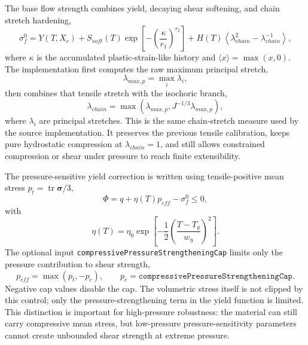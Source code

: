 The base flow strength combines yield, decaying shear softening, and chain stretch hardening,
\begin{equation}
  \sigma_f^0 =
  Y(T,X_c)
  + S_{soft}(T)\exp\left[-\left(\frac{\kappa}{r_1}\right)^{r_2}\right]
  + H(T)\left\langle \lambda_{chain}^{2}-\lambda_{chain}^{-1}\right\rangle,
  \label{eq:surface-polymer-base-flow}
\end{equation}
where \(\kappa\) is the accumulated plastic-strain-like history and \(\langle x\rangle=\max(x,0)\).  The implementation first computes the raw maximum principal stretch,
\begin{equation}
  \lambda_{max,p}=\max_i \lambda_i,
\end{equation}
then combines that tensile stretch with the isochoric branch,
\begin{equation}
  \lambda_{chain}=\max\left(\lambda_{max,p}, J^{-1/3}\lambda_{max,p}\right),
  \label{eq:surface-polymer-chain-stretch}
\end{equation}
where \(\lambda_i\) are principal stretches.  This is the same chain-stretch measure used by the source implementation.  It preserves the previous tensile calibration, keeps pure hydrostatic compression at \(\lambda_{chain}=1\), and still allows constrained compression or shear under pressure to reach finite extensibility.

The pressure-sensitive yield correction is written using tensile-positive mean stress \(p_t=\operatorname{tr}\boldsymbol{\sigma}/3\),
\begin{equation}
  \Phi=q+\eta(T)p_{eff}-\sigma_f^0\le 0,
  \label{eq:surface-polymer-yield}
\end{equation}
with
\begin{equation}
  \eta(T)=\eta_0\exp\left[-\frac{1}{2}\left(\frac{T-T_g}{w_{\eta}}\right)^2\right].
  \label{eq:surface-polymer-pressure-asymmetry}
\end{equation}
The optional input \texttt{compressivePressureStrengtheningCap} limits only the pressure contribution to shear strength,
\begin{equation}
  p_{eff}=\max\left(p_t,-p_c\right),
  \qquad
  p_c=\texttt{compressivePressureStrengtheningCap}.
  \label{eq:surface-polymer-pressure-cap}
\end{equation}
Negative cap values disable the cap.  The volumetric stress itself is not clipped by this control; only the pressure-strengthening term in the yield function is limited.  This distinction is important for high-pressure robustness: the material can still carry compressive mean stress, but low-pressure pressure-sensitivity parameters cannot create unbounded shear strength at extreme pressure.

